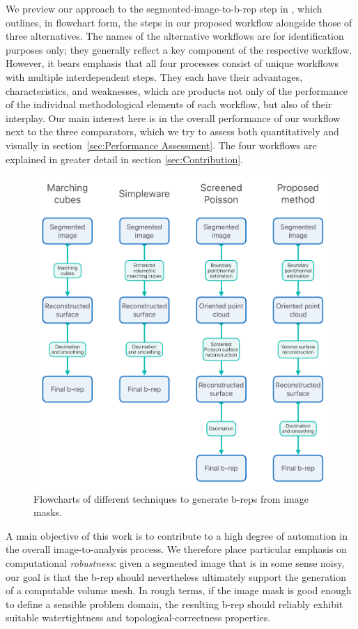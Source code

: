 We preview our approach to the segmented-image-to-b-rep step in , which outlines, in flowchart form, the steps in our proposed workflow alongside those of three alternatives.  The names of the alternative workflows are for identification purposes only; they generally reflect a key component of the respective workflow.  However, it bears emphasis that all four processes consist of unique workflows with multiple interdependent steps. They each have their advantages, characteristics, and weaknesses, which are products not only of the performance of the individual methodological elements of each workflow, but also of their interplay.  Our main interest here is in the overall performance of our workflow next to the three comparators, which we try to assess both quantitatively and visually in section~\ref{sec:Performance Assessment}. The four workflows are explained in greater detail in section \ref{sec:Contribution}.

\begin{figure}[t]
	\centering
		\includegraphics[scale=0.3]{media/flowchartNew.pdf}
	\caption{Flowcharts of different techniques to generate b-reps from image masks.}
	\label{fig:flowchart}
\end{figure}\noindent

A main objective of this work is to
contribute to a high degree of automation in the overall image-to-analysis process.  We therefore place particular emphasis on 
computational {\em robustness}:  given a segmented image that is in some sense noisy, our goal is that the b-rep should nevertheless ultimately support the generation of a computable volume mesh.  In rough terms, if the image mask is good enough to define a sensible problem domain, the resulting b-rep should reliably exhibit suitable watertightness and topological-correctness properties.

